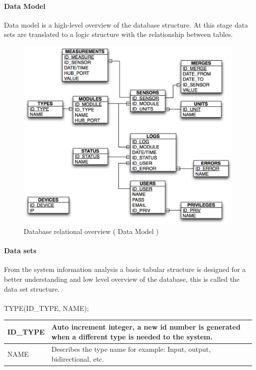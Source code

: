 \paragraph{Data Model}
Data model is a high-level overview of the database structure. At this stage data sets are translated to a logic structure with the relationship between tables.

\begin{figure}[H]
	\begin{centering}
		\includegraphics[width=1.0\textwidth]{images/db_datamodel.png}
		\caption{Database relational overview ( Data Model )}
	\end{centering}
\end{figure}

\paragraph{Data sets}
From the system information analysis a basic tabular structure is designed for a better understanding and low level overview of the database, this is called the data set structure.
\\\\

TYPE(ID\_TYPE, NAME);

\begin{table}[H]
\centering
	\begin{tabular}{| p{2cm} | p{10cm} |}
		\hline
		ID\_TYPE & Auto increment integer, a new id number is generated when a different type is needed to the system. \\\hline
		NAME & Describes the type name for example: Input, output, bidirectional, etc.\\\hline
	\end{tabular}
\end{table}

